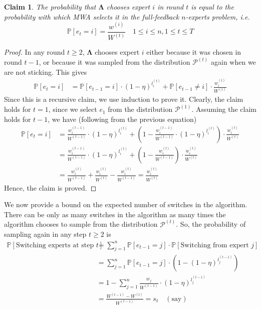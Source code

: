 \documentclass[11pt]{article}
\newtheorem{claim}{Claim}
\newcommand{\prob}[1]{{\mathbb P[#1]}}
\begin{document}
\begin{claim}
    \label{claim:prob}
    The probability that $\mathbf{\Lambda}$ chooses expert $i$ in round $t$ is equal to the probability with
    which MWA selects it in the full-feedback $n$-experts problem, i.e.
    \begin{equation}
        \mathbb{P}[e_{t} = i] = \frac{w^{(i)}}{W^{(t)}} \quad 1 \leq i \leq n, 1 \leq t \leq T
    \end{equation}
\end{claim}
\begin{proof}
    In any round $t \geq 2$, $\mathbf{\Lambda}$ chooses expert $i$ either because it was
    chosen in round $t-1$, or because it was sampled from the distribution $\mathcal{P}^{(t)}$ again
    when we are not sticking.
    This gives
    \begin{align}
        \mathbb{P}[e_{t} = i] &= \mathbb{P}[e_{t-1} = i] \cdot (1 - \eta)^{l_{i}^{(t)}} + \mathbb{P}[e_{t-1} \neq i] \cdot \frac{w_{i}^{(t)}}{W^{(t)}}
    \end{align}
    Since this is a recursive claim, we use induction to prove it. Clearly, the claim holds for $t = 1$, since we
    select $e_{1}$ from the distribution $\mathcal{P}^{(1)}$.
    Assuming the claim holds for $t-1$, we have (following from the previous equation)
    \begin{align}
        \mathbb{P}[e_{t} = i] &= \frac{w_{i}^{(t-1)}}{W^{(t-1)}} \cdot (1 - \eta)^{l_{i}^{(t)}} + \left(1 - \frac{w_{i}^{(t-1)}}{W^{(t-1)}} \cdot (1 - \eta)^{l_{i}^{(t)}} \right) \cdot \frac{w_{i}^{(t)}}{W^{(t)}} \\
        &= \frac{w_{i}^{(t-1)}}{W^{(t-1)}} \cdot (1 - \eta)^{l_{i}^{(t)}} + \left(1 - \frac{w_{i}^{(t)}}{W^{(t-1)}} \right) \cdot \frac{w_{i}^{(t)}}{W^{(t)}} \\
        &= \frac{w_{i}^{(t)}}{W^{(t-1)}} + \frac{w_{i}^{(t)}}{W^{(t)}} - \frac{w_{i}^{(t)}}{W^{(t-1)}} = \frac{w_{i}^{(t)}}{W^{(t)}}
    \end{align}
    Hence, the claim is proved.
\end{proof}
We now provide a bound on the expected number of switches in the algorithm. There can be only as many switches in the algorithm as many
times the algorithm chooses to sample from the distribution $\mathcal{P}^{(t)}$. So, the probability
of sampling again in any step $t \geq 2$ is
\begin{align}
    \mathbb{P}[\text{Switching experts at step } t] &= \sum_{j=1}^{n} \mathbb{P}\left[ e_{t-1} = j \right] \cdot \prob{\text{Switching from expert } j} \\
    &= \sum_{j=1}^{n} \mathbb{P}\left[ e_{t-1} = j \right] \cdot \left( 1 - (1 - \eta)^{l_{j}^{(t-1)}} \right) \\
    &= 1 - \sum_{j=1}^{n} \frac{w_{j}}{W^{(t-1)}} \cdot (1 - \eta)^{l_{j}^{(t-1)}} \\
    &= \frac{W^{(t-1)} - W^{(t)}}{W^{(t-1)}} = s_{t} \quad (\text{say})
\end{align}
\end{document}
